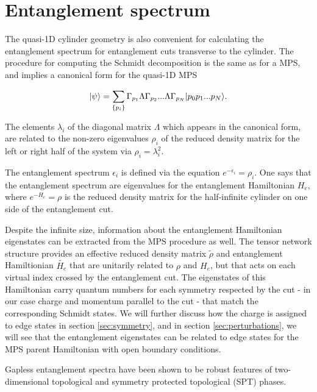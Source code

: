 
\section{Entanglement spectrum}
\label{sec:ES}

The quasi-1D cylinder geometry is also convenient for calculating the 
entanglement spectrum for entanglement cuts transverse to the 
cylinder. The procedure for computing the Schmidt decomposition is the 
same as for a MPS, and implies a canonical form for the quasi-1D MPS

$$
\vert \psi \rangle = \sum\limits_{\{p_i\}} \Gamma_{p_1} \Lambda \Gamma_{p_2} ... \Lambda \Gamma_{p_N} \vert p_0 p_1 ... p_N \rangle.
$$

The elements $\lambda_i$ of the diagonal matrix $\Lambda$ which 
appears in the canonical form,
are related to the non-zero eigenvalues $\rho_i$ of the reduced 
density matrix for the left or right half of the system via $\rho_i = 
\lambda_i^2$.

The entanglement spectrum $\epsilon_i$  is defined via the equation 
$e^{-\epsilon_i} = \rho_i$. One says that the entanglement spectrum 
are eigenvalues for the entanglement Hamiltonian $H_e$, where 
$e^{-H_e} = \rho$ is the reduced density matrix for the half-infinite 
cylinder on one side of the entanglement cut. 

Despite the infinite size, information about the entanglement 
Hamiltonian eigenstates can be extracted from the MPS procedure as 
well. The tensor network structure provides an effective reduced 
density matrix $\tilde{\rho}$ and entanglement Hamiltionian 
$\tilde{H_e}$ that are unitarily related to $\rho$ and $H_e$, but that 
acts on each virtual index crossed by the entanglement cut. The 
eigenstates of this Hamiltonian carry quantum numbers for each 
symmetry respected by the cut - in our case charge and momentum 
parallel to the cut - that match the corresponding Schmidt states. We 
will further discuss how the charge is assigned to edge states in 
section \ref{sec:symmetry}, and in section \ref{sec:perturbations}, we 
will see that the entanglement eigenstates can be related to edge 
states for the MPS parent Hamiltonian with open boundary conditions. 

Gapless entanglement spectra have been shown to be robust features of two-dimensional topological and symmetry protected topological (SPT) phases.


